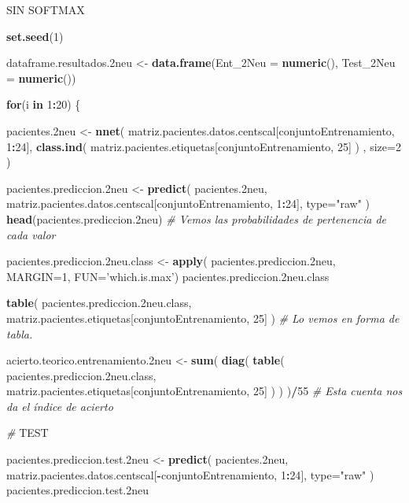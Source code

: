 \documentclass[]{article}
\newenvironment{Shaded}{\begin{snugshade}}{\end{snugshade}}
\newcommand{\KeywordTok}[1]{\textcolor[rgb]{0.13,0.29,0.53}{\textbf{#1}}}
\newcommand{\DataTypeTok}[1]{\textcolor[rgb]{0.13,0.29,0.53}{#1}}
\newcommand{\DecValTok}[1]{\textcolor[rgb]{0.00,0.00,0.81}{#1}}
\newcommand{\StringTok}[1]{\textcolor[rgb]{0.31,0.60,0.02}{#1}}
\newcommand{\CommentTok}[1]{\textcolor[rgb]{0.56,0.35,0.01}{\textit{#1}}}
\newcommand{\ControlFlowTok}[1]{\textcolor[rgb]{0.13,0.29,0.53}{\textbf{#1}}}
\newcommand{\OperatorTok}[1]{\textcolor[rgb]{0.81,0.36,0.00}{\textbf{#1}}}
\newcommand{\AlertTok}[1]{\textcolor[rgb]{0.94,0.16,0.16}{#1}}
\newcommand{\NormalTok}[1]{#1}
\begin{document}
SIN SOFTMAX

\begin{Shaded}
\begin{Highlighting}[]
\KeywordTok{set.seed}\NormalTok{(}\DecValTok{1}\NormalTok{)}

\NormalTok{dataframe.resultados.2neu <-}\StringTok{ }\KeywordTok{data.frame}\NormalTok{(}\DataTypeTok{Ent_2Neu =} \KeywordTok{numeric}\NormalTok{(),}
                                        \DataTypeTok{Test_2Neu =} \KeywordTok{numeric}\NormalTok{())}

\ControlFlowTok{for}\NormalTok{(i }\ControlFlowTok{in} \DecValTok{1}\OperatorTok{:}\DecValTok{20}\NormalTok{)}
\NormalTok{\{}

\NormalTok{  pacientes.2neu <-}\StringTok{ }\KeywordTok{nnet}\NormalTok{( matriz.pacientes.datos.centscal[conjuntoEntrenamiento, }\DecValTok{1}\OperatorTok{:}\DecValTok{24}\NormalTok{], }\KeywordTok{class.ind}\NormalTok{( matriz.pacientes.etiquetas[conjuntoEntrenamiento, }\DecValTok{25}\NormalTok{] ) , }\DataTypeTok{size=}\DecValTok{2}\NormalTok{ )}
  
\NormalTok{  pacientes.prediccion.2neu <-}\StringTok{ }\KeywordTok{predict}\NormalTok{( pacientes.2neu, matriz.pacientes.datos.centscal[conjuntoEntrenamiento, }\DecValTok{1}\OperatorTok{:}\DecValTok{24}\NormalTok{], }\DataTypeTok{type=}\StringTok{"raw"}\NormalTok{ )}
  \KeywordTok{head}\NormalTok{(pacientes.prediccion.2neu) }\CommentTok{# Vemos las probabilidades de pertenencia de cada valor}
  
\NormalTok{  pacientes.prediccion.2neu.class <-}\StringTok{ }\KeywordTok{apply}\NormalTok{( pacientes.prediccion.2neu, }\DataTypeTok{MARGIN=}\DecValTok{1}\NormalTok{, }\DataTypeTok{FUN=}\StringTok{'which.is.max'}\NormalTok{)}
\NormalTok{  pacientes.prediccion.2neu.class}
  
  
  \KeywordTok{table}\NormalTok{( pacientes.prediccion.2neu.class, matriz.pacientes.etiquetas[conjuntoEntrenamiento, }\DecValTok{25}\NormalTok{] )  }\CommentTok{# Lo vemos en forma de tabla.}
  
\NormalTok{  acierto.teorico.entrenamiento.2neu <-}\StringTok{ }\KeywordTok{sum}\NormalTok{( }\KeywordTok{diag}\NormalTok{( }\KeywordTok{table}\NormalTok{( pacientes.prediccion.2neu.class, matriz.pacientes.etiquetas[conjuntoEntrenamiento, }\DecValTok{25}\NormalTok{] ) ) )}\OperatorTok{/}\DecValTok{55} \CommentTok{# Esta cuenta nos da el índice de acierto}
  
  \CommentTok{# }\AlertTok{TEST}
  
\NormalTok{  pacientes.prediccion.test.2neu <-}\StringTok{ }\KeywordTok{predict}\NormalTok{( pacientes.2neu, matriz.pacientes.datos.centscal[}\OperatorTok{-}\NormalTok{conjuntoEntrenamiento, }\DecValTok{1}\OperatorTok{:}\DecValTok{24}\NormalTok{], }\DataTypeTok{type=}\StringTok{"raw"}\NormalTok{ )}
\NormalTok{  pacientes.prediccion.test.2neu}
  

\end{Highlighting}
\end{Shaded}
\end{document}

